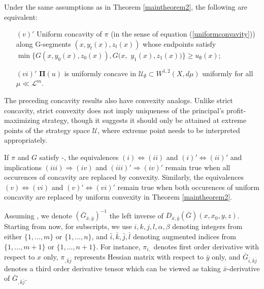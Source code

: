 \begin{corollary}\label{Cor:concave2}
	Under the same assumptions as in Theorem \ref{maintheorem2},  the following are equivalent:
	


\begin{enumerate}[(i)]
	\item[$(v)'$] Uniform concavity of $\pi$  (in the sense of equation (\ref{uniformconvavity})) along G-segments $(x, y_t(x), z_t(x))$ whose 
	endpoints satisfy $\min\{G(x, y_0(x), z_0(x)), G(x,$ $y_1(x),z_1(x))\} \ge u_{\emptyset}(x)$;
	\item[$(vi)'$] $\pmb \Pi(u)$ is uniformly concave  in $\mathcal{U}_{\emptyset} \subset W^{1,2}(X,d\mu)$   uniformly
	for all $\mu\ll \mathcal{L}^m$.
\end{enumerate}

\end{corollary}

The preceding concavity results also have convexity analogs. Unlike strict concavity, strict convexity does not
imply uniqueness of the principal's profit-maximizing strategy, though it suggests it should only be attained at 
extreme points of the strategy space $\mathcal U$,  where extreme point needs to be interpreted appropriately.
\medskip


\begin{remark}\label{remarkmaintheorem1}
	If $\pi$ and $G$ satisfy \Gzero-\Gfive,  the equivalences 
	$(i) \Leftrightarrow (ii)$ and $(i)' \Leftrightarrow (ii)'$ and implications $(iii) \Rightarrow (iv)$ and $(iii)' \Rightarrow (iv)'$ remain true when all occurences of concavity are replaced by convexity.
	Similarly,  the equivalences $(v) \Leftrightarrow (vi)$ and $(v)' \Leftrightarrow (vi)'$ remain true when both
	occurences of uniform concavity are replaced by uniform convexity in Theorem \ref{maintheorem2}. 
\end{remark}
\medskip





Assuming \Gsix, we denote $(\bar{G}_{\bar{x}, \bar{y}})^{-1}$ the left inverse of $D_{\bar{x},\bar{y}}(\bar{G})(x,x_0,y,z)$.
Starting from now, for subscripts, we use $i,k,j,l, \alpha, \beta$ denoting integers  from either $\{1,...,m\}$ or $\{ 1,..., n\}$, and $\bar{i},\bar{k},\bar{j},\bar{l}$ denoting augmented indices from $\{1,...,m+1\}$ or $ \{1, ..., n+1\}$. For instance, $\pi_{i,}$ denotes first order derivative with respect to $x$ only, $\pi_{,\bar{k}\bar{j}}$ represents Hessian matrix with respect to $\bar{y}$ only, and $\bar{G}_{\bar{i},\bar{k}\bar{j}}$ denotes a third order derivative tensor which can be viewed as taking $\bar{x}$-derivative of $\bar{G}_{,\bar{k}\bar{j}}$.
\medskip

